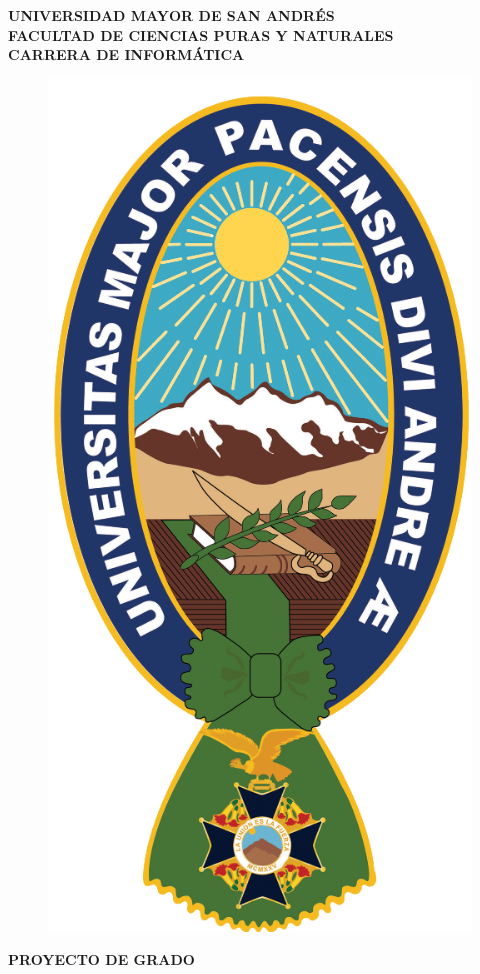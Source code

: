 \begin{titlepage}
	\begin{center}
		{\textbf{UNIVERSIDAD MAYOR DE SAN ANDRÉS}}\\
		{\textbf{FACULTAD DE CIENCIAS PURAS Y NATURALES}}\\
		{\textbf{CARRERA DE INFORMÁTICA}}\\
		\vspace{5mm}
		\begin{figure}[h]
			\centering
			\includegraphics[scale=1.2]{imagenes/Logo_UMSA.png}
		\end{figure}
		\vspace{3mm}
		{\textbf{PROYECTO DE GRADO}}\\
		

\end{center}
\end{titlepage}
